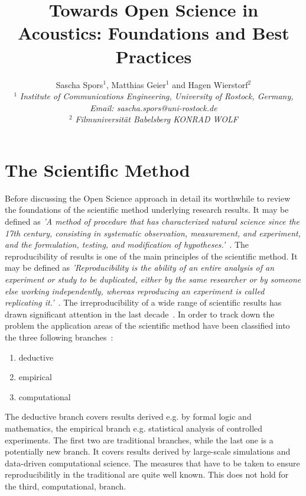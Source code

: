 \documentclass[a4paper, 10pt, twocolumn]{article}
\date{}                                         %
\title{\vspace{-8mm}\textbf{\large
Towards Open Science in Acoustics: Foundations and Best Practices}}
\author{
Sascha Spors$^1$, Matthias Geier$^1$ and Hagen Wierstorf$^2$\\
$^1$ \emph{\small Institute of Communications Engineering, University of Rostock, Germany, Email: sascha.spors@uni-rostock.de}\\
$^2$ \emph{\small Filmuniversität Babelsberg KONRAD WOLF}}
\begin{document}
\maketitle
\thispagestyle{empty}           %

\section*{The Scientific Method} \label{sec:intro} 

Before discussing the Open Science approach in detail its worthwhile to review the
foundations of the scientific method underlying research results. It may be defined 
as \emph{'A method of procedure that has characterized natural science since the 17th 
century, consisting in systematic observation, measurement, and experiment, and the 
formulation, testing, and modification of hypotheses.'}~\cite{scientific_method:OXD}.
The reproducibility of results is one of the main principles of the scientific method. 
It may be defined as \emph{'Reproducibility is the ability of an entire analysis of 
an experiment or study to be duplicated, either by the same researcher or by someone 
else working independently, whereas reproducing an experiment is called replicating 
it.'}~\cite{Leek15:PNAS}. 
The irreproducibility of a wide range of scientific results has drawn significant 
attention in the last decade~\cite{Borgwardt:Book,retraction:WWW,ioannidis05:PLOS, open15:AAAS, chalmers09:OG, freedman15:PLOS, howells14:Nature}. 
In order to track down the problem the application areas of the scientific method have been
classified into the three following branches~\cite{Donoho:CSE, Stodden2014:talk}:
\begin{enumerate}
\item deductive
\item empirical
\item computational
\end{enumerate}
The deductive branch covers results derived e.g. by formal logic and mathematics, the empirical
branch e.g. statistical analysis of controlled experiments. The first two are traditional branches, 
while the last one is a potentially new branch. It covers results derived by large-scale simulations
and data-driven computational science. The measures that have to be taken to ensure reproducibilitly
in the traditional are quite well known. This does not hold for the third, computational, branch.
\end{document}
